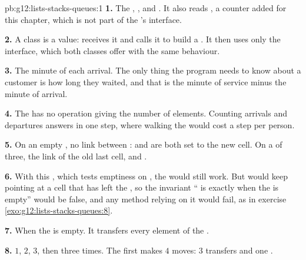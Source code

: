 \begin{solution}{pb:g12:lists-stacks-queues:1}
\textbf{1.} The , ,  and . It also reads , a counter
added for this chapter, which is not part of the 's interface.

\textbf{2.} A class is a value:  receives it and calls it to build a . It then uses only the
interface, which both classes offer with the same behaviour.

\textbf{3.} The minute of each arrival. The only thing the program needs to know about a customer is how long they
waited, and that is the minute of service minus the minute of arrival.

\textbf{4.} The  has no operation giving the number of elements. Counting arrivals and departures
answers in one step, where walking the  would cost a step per person.

\textbf{5.} On an empty , no link between :  and  are both set to the new cell. On
a  of three, the link of the old last cell, and .

\textbf{6.} With this , which tests emptiness on , the  would still work. But
 would keep pointing at a cell that has left the , so the invariant `` is 
exactly when the  is empty'' would be false, and any method relying on it would fail, as in exercise
\ref{exo:g12:lists-stacks-queues:8}.

\textbf{7.} When the  is empty. It transfers every element of the .

\textbf{8.}  $1$, $2$, $3$, then  three times. The first  makes $4$ moves: $3$ transfers and one
.


\end{solution}
